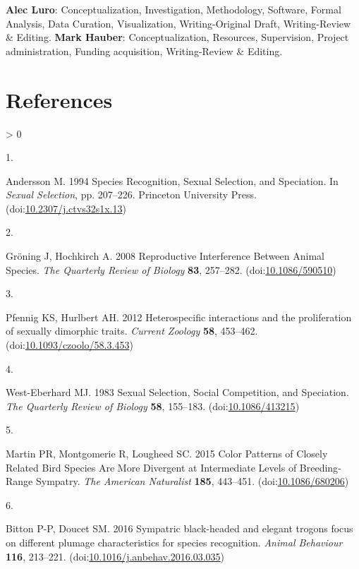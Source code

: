\documentclass[
  a4paper,
]{article}
\newlength{\cslhangindent}
\newlength{\csllabelwidth}
\newenvironment{CSLReferences}[2] %
 {%
  \setlength{\parindent}{0pt}
  \ifodd #1 \everypar{\setlength{\hangindent}{\cslhangindent}}\ignorespaces\fi
  \ifnum #2 > 0
  \setlength{\parskip}{#2\baselineskip}
  \fi
 }%
 {}
\newcommand{\CSLLeftMargin}[1]{\parbox[t]{\csllabelwidth}{#1}}
\newcommand{\CSLRightInline}[1]{\parbox[t]{\linewidth - \csllabelwidth}{#1}\break}
\begin{document}
\textbf{Alec Luro}: Conceptualization, Investigation, Methodology,
Software, Formal Analysis, Data Curation, Visualization,
Writing-Original Draft, Writing-Review \& Editing. \textbf{Mark Hauber}:
Conceptualization, Resources, Supervision, Project administration,
Funding acquisition, Writing-Review \& Editing.

\hypertarget{references}{%
\section*{References}\label{references}}

\hypertarget{refs}{}
\begin{CSLReferences}{0}{0}
\leavevmode\hypertarget{ref-andersson1994}{}%
\CSLLeftMargin{1. }
\CSLRightInline{Andersson M. 1994 Species {Recognition}, {Sexual
Selection}, and {Speciation}. In \emph{Sexual {Selection}}, pp.
207--226. {Princeton University Press}.
(doi:\href{https://doi.org/10.2307/j.ctvs32s1x.13}{10.2307/j.ctvs32s1x.13})}

\leavevmode\hypertarget{ref-groning2008}{}%
\CSLLeftMargin{2. }
\CSLRightInline{Gröning J, Hochkirch A. 2008 Reproductive {Interference
Between Animal Species}. \emph{The Quarterly Review of Biology}
\textbf{83}, 257--282.
(doi:\href{https://doi.org/10.1086/590510}{10.1086/590510})}

\leavevmode\hypertarget{ref-pfennig2012}{}%
\CSLLeftMargin{3. }
\CSLRightInline{Pfennig KS, Hurlbert AH. 2012 Heterospecific
interactions and the proliferation of sexually dimorphic traits.
\emph{Current Zoology} \textbf{58}, 453--462.
(doi:\href{https://doi.org/10.1093/czoolo/58.3.453}{10.1093/czoolo/58.3.453})}

\leavevmode\hypertarget{ref-west-eberhard1983}{}%
\CSLLeftMargin{4. }
\CSLRightInline{West-Eberhard MJ. 1983 Sexual {Selection}, {Social
Competition}, and {Speciation}. \emph{The Quarterly Review of Biology}
\textbf{58}, 155--183.
(doi:\href{https://doi.org/10.1086/413215}{10.1086/413215})}

\leavevmode\hypertarget{ref-martin2015a}{}%
\CSLLeftMargin{5. }
\CSLRightInline{Martin PR, Montgomerie R, Lougheed SC. 2015 Color
{Patterns} of {Closely Related Bird Species Are More Divergent} at
{Intermediate Levels} of {Breeding}-{Range Sympatry}. \emph{The American
Naturalist} \textbf{185}, 443--451.
(doi:\href{https://doi.org/10.1086/680206}{10.1086/680206})}

\leavevmode\hypertarget{ref-bitton2016}{}%
\CSLLeftMargin{6. }
\CSLRightInline{Bitton P-P, Doucet SM. 2016 Sympatric black-headed and
elegant trogons focus on different plumage characteristics for species
recognition. \emph{Animal Behaviour} \textbf{116}, 213--221.
(doi:\href{https://doi.org/10.1016/j.anbehav.2016.03.035}{10.1016/j.anbehav.2016.03.035})}


\end{CSLReferences}
\end{document}
